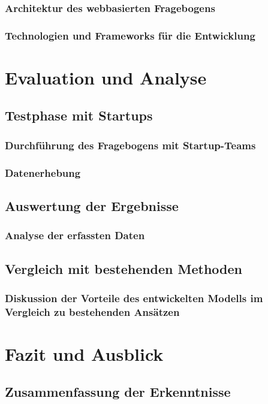 \subsection{Architektur des webbasierten Fragebogens}
\subsection{Technologien und Frameworks für die Entwicklung}

\chapter{Evaluation und Analyse}

\section{Testphase mit Startups}
\subsection{Durchführung des Fragebogens mit Startup-Teams}
\subsection{Datenerhebung}

\section{Auswertung der Ergebnisse}
\subsection{Analyse der erfassten Daten}

\section{Vergleich mit bestehenden Methoden}
\subsection{Diskussion der Vorteile des entwickelten Modells im Vergleich zu bestehenden Ansätzen}

\chapter{Fazit und Ausblick}

\section{Zusammenfassung der Erkenntnisse}
